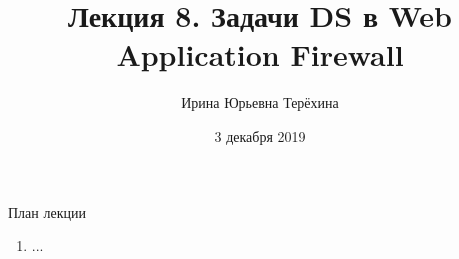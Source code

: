 


\title{Лекция 8. Задачи DS в Web Application Firewall}

\date{3 декабря 2019}
\author{Ирина Юрьевна Терёхина}


  \maketitle
    
\begin{frame}{План лекции}
    \begin{enumerate}
    	\item ...
	\end{enumerate}
\end{frame}





